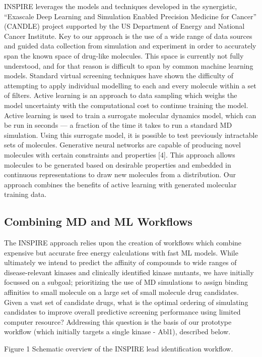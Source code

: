 INSPIRE leverages the models and techniques developed in the synergistic,
“Exascale Deep Learning and Simulation Enabled Precision Medicine for Cancer”
(CANDLE) project supported by the US Department of Energy and  National Cancer
Institute. Key to our approach is the use of a wide range of data sources and
guided data collection from simulation and experiment in order to accurately
span the known space of drug-like molecules. This space is currently not fully
understood, and for that reason is difficult to span by common machine
learning models. Standard virtual screening techniques have shown the
difficulty of attempting to apply individual modelling to each and every
molecule within a set of filters. Active learning is an approach to data
sampling which weighs the model uncertainty with the computational cost to
continue training the model. Active learning is used to train a surrogate
molecular dynamics model, which can be run in seconds — a fraction of the time
it takes to run a standard MD simulation. Using this surrogate model, it is
possible to test previously intractable sets of molecules. Generative neural
networks are capable of producing novel molecules with certain constraints and
properties [4].  This approach allows molecules to be generated based on
desirable properties and embedded in continuous representations to draw new
molecules from a distribution. Our approach combines the benefits of active
learning with generated molecular training data.

\subsection{Combining MD and ML Workflows}

The INSPIRE approach relies upon the creation of workflows which combine
expensive but accurate free energy calculations with fast ML models. While
ultimately we intend to predict the affinity of compounds to wide ranges of
disease-relevant kinases and clinically identified kinase mutants, we have
initially focussed on a subgoal;  prioritizing the use of MD simulations to
assign binding affinities to small molecule on a large set of small molecule
drug candidates. Given a vast set of candidate drugs, what is the optimal
ordering of simulating candidates to improve overall predictive screening
performance using limited computer resource? Addressing this question is the
basis of our prototype workflow (which initially targets a single kinase -
Abl1), described below.


Figure 1 Schematic overview of the INSPIRE lead identification workflow.

